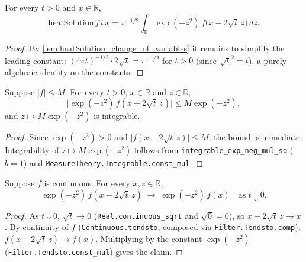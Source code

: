 \begin{lemma}
    \label{lem:heatSolution_eq_subst}
    \leanok
    For every $t > 0$ and $x \in \mathbb{R}$,
    \[ \mathrm{heatSolution}\,f\,t\,x
       = \pi^{-1/2} \int_{\mathbb{R}} \exp(-z^2)\, f\bigl(x - 2\sqrt{t}\,z\bigr)\, dz. \]
\end{lemma}
\begin{proof}
    By \cref{lem:heatSolution_change_of_variables} it remains to simplify the leading
    constant: $(4\pi t)^{-1/2}\cdot 2\sqrt{t} = \pi^{-1/2}$ for $t > 0$ (since
    $\sqrt{t}^2 = t$), a purely algebraic identity on the constants.
\end{proof}

\begin{lemma}
    \label{lem:subst_integrand_bound}
    \leanok
    Suppose $\lvert f\rvert \le M$. For every $t > 0$, $x \in \mathbb{R}$ and
    $z \in \mathbb{R}$,
    \[ \bigl\lvert \exp(-z^2)\, f(x - 2\sqrt{t}\,z)\bigr\rvert \le M\exp(-z^2), \]
    and $z \mapsto M\exp(-z^2)$ is integrable.
\end{lemma}
\begin{proof}
    Since $\exp(-z^2) > 0$ and $\lvert f(x-2\sqrt{t}\,z)\rvert \le M$, the bound is
    immediate. Integrability of $z \mapsto M\exp(-z^2)$ follows from
    \texttt{integrable\_exp\_neg\_mul\_sq} ($b=1$) and
    \texttt{MeasureTheory.Integrable.const\_mul}.
\end{proof}

\begin{lemma}
    \label{lem:subst_integrand_tendsto}
    \leanok
    Suppose $f$ is continuous. For every $x, z \in \mathbb{R}$,
    \[ \exp(-z^2)\, f(x - 2\sqrt{t}\,z) \;\longrightarrow\; \exp(-z^2)\, f(x)
       \quad\text{as } t \downarrow 0. \]
\end{lemma}
\begin{proof}
    As $t \downarrow 0$, $\sqrt{t} \to 0$ (\texttt{Real.continuous\_sqrt} and
    $\sqrt{0}=0$), so $x - 2\sqrt{t}\,z \to x$. By continuity of $f$
    (\texttt{Continuous.tendsto}, composed via \texttt{Filter.Tendsto.comp}),
    $f(x - 2\sqrt{t}\,z) \to f(x)$. Multiplying by the constant $\exp(-z^2)$
    (\texttt{Filter.Tendsto.const\_mul}) gives the claim.
\end{proof}

